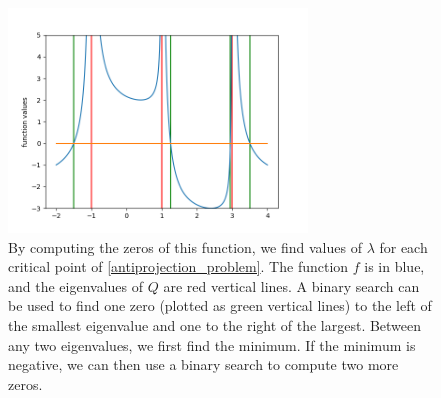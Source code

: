 \begin{figure}[ht]
    \centering
    \includegraphics[width=300px]{images/antiprojection.png}
    \caption[
    		An example plot of the one-dimensional function whose zeros provide the largest ellipsoid within the buffering cones.
		]{
    		By computing the zeros of this function, we find values of $\lambda$ for each critical point of \cref{antiprojection_problem}.
    		The function $f$ is in blue, and the eigenvalues of $Q$ are red vertical lines.
    		A binary search can be used to find one zero (plotted as green vertical lines) to the left of the smallest eigenvalue and one to the right of the largest.
    		Between any two eigenvalues, we first find the minimum.
    		If the minimum is negative, we can then use a binary search to compute two more zeros.
	}
    \label{antiprojection_image}
\end{figure}


